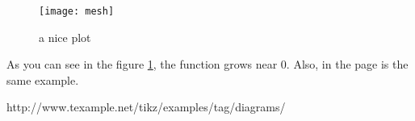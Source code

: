 
\begin{figure}[h]
    \centering
    \texttt{[image: mesh]}
    \caption{a nice plot}
    \label{fig:mesh1}
\end{figure}
 
As you can see in the figure \ref{fig:mesh1}, the 
function grows near 0. Also, in the page \pageref{fig:mesh1} 
is the same example.


http://www.texample.net/tikz/examples/tag/diagrams/